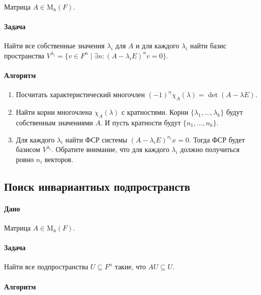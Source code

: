 \documentclass{article}
\newcommand{\Matrix}[2]{\operatorname{\mathrm{M}_{#2}}(#1)}
\begin{document}
Матрица $A\in\Matrix{F}{n}$.

\paragraph{Задача}

Найти все собственные значения $\lambda_i$ для $A$ и для каждого $\lambda_i$ найти базис пространства $V^{\lambda_i} = \{v\in F^{n}\mid \exists n\colon (A - \lambda_i E)^n v = 0\}$.

\paragraph{Алгоритм}

\begin{enumerate}
\item Посчитать характеристический многочлен $(-1)^n\chi_A(\lambda) = \det(A-\lambda E)$.

\item Найти корни многочлена $\chi_A(\lambda)$ с кратностями.
Корни $\{\lambda_1,\ldots,\lambda_k\}$ будут собственным значениями $A$.
И пусть кратности будут $\{n_1,\ldots, n_k\}$.

\item Для каждого $\lambda_i$ найти ФСР системы $(A-\lambda_i E)^{n_i}x = 0$.
Тогда ФСР будет базисом $V^{\lambda_i}$.
Обратите внимание, что для каждого $\lambda_i$ должно получиться ровно $n_i$ векторов.
\end{enumerate}

\subsection{Поиск инвариантных подпространств}

\paragraph{Дано}

Матрица $A\in\Matrix{F}{n}$.

\paragraph{Задача}

Найти все подпространства $U\subseteq F^n$ такие, что $A U \subseteq U$.

\paragraph{Алгоритм}
\end{document}
